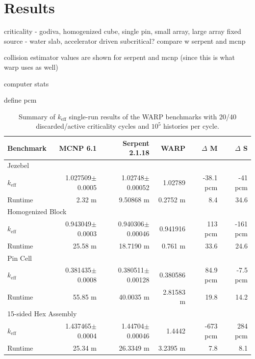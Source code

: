 \chapter{Results}
\label{chap:results}


criticality - godiva, homogenized cube, single pin,  small array, large array
fixed source - water slab, accelerator driven subcritical?
compare w serpent and mcnp

collision estimator values are shown for serpent and mcnp (since this is what warp uses as well)

computer stats

define pcm

\begin{table}[h]
\centering
\caption{Summary of $k_\mathrm{eff}$ single-run results of the WARP benchmarks with 20/40 discarded/active criticality cycles and $10^5$ histories per cycle.}
\label{benchmark_summary}
\begin{tabular}{| l | r | r | r | r | r |}
 \hline
 Benchmark & MCNP 6.1 & Serpent 2.1.18 & WARP & $\Delta$ M & $\Delta$ S  \\
\hline
\hline
\multicolumn{6}{|l|}{Jezebel}  \\
\hline
 $k_\mathrm{eff}$ & 1.027509$\pm$0.0005 & 1.02748$\pm$0.00052 & 1.02789 & -38.1 pcm & -41 pcm  \\
 \hline
 Runtime               & 2.32 m & 9.50868 m & 0.2752 m & 8.4  & 34.6  \\
 \hline
 \hline
\multicolumn{6}{|l|}{Homogenized Block }\\
\hline
 $k_\mathrm{eff}$ & 0.943049$\pm$0.0003 & 0.940306$\pm$0.00046 & 0.941916 & 113 pcm & -161 pcm   \\
 \hline
 Runtime               &  25.58 m & 18.7190 m & 0.761 m & 33.6  & 24.6  \\
 \hline
  \hline
\multicolumn{6}{|l|}{Pin Cell}\\
\hline
 $k_\mathrm{eff}$ & 0.381435$\pm$0.0008 &  0.380511$\pm$0.00128 & 0.380586 & 84.9 pcm &  -7.5 pcm    \\
 \hline
 Runtime               & 55.85 m & 40.0035 m &  2.81583 m &  19.8 & 14.2  \\
 \hline
  \hline
\multicolumn{6}{|l|}{15-sided Hex Assembly}\\
\hline
 $k_\mathrm{eff}$ & 1.437465$\pm$0.0004 & 1.44704$\pm$0.00046 & 1.4442 & -673 pcm & 284 pcm  \\
 \hline
 Runtime               & 25.34 m &  26.3349 m &  3.2395 m  & 7.8 & 8.1  \\
 \hline
\end{tabular}
\end{table}


